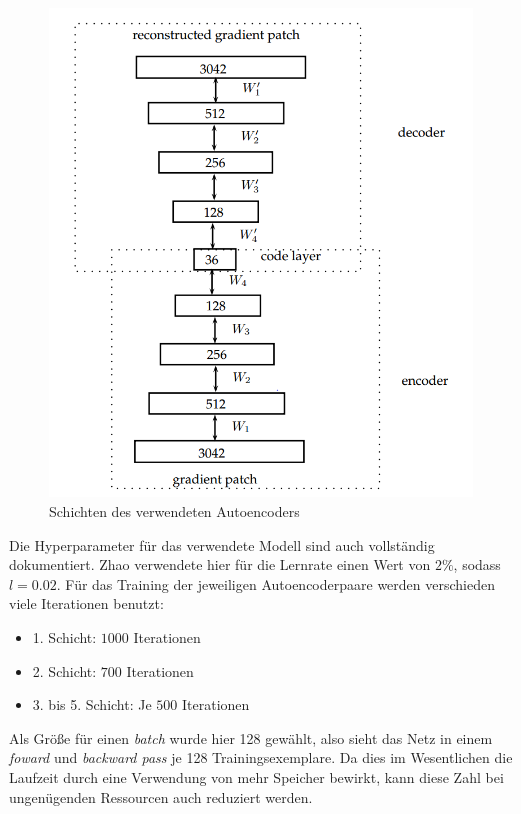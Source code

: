 \begin{figure}
	\centering
	\includegraphics[scale=0.6]{images/ae_model.png}
	\caption{Schichten des verwendeten Autoencoders \cite{aed2016}}
	\label{img:ae_model}
\end{figure}

Die Hyperparameter für das verwendete Modell sind auch vollständig dokumentiert. Zhao verwendete hier für die Lernrate einen Wert von $2\%$, sodass $l = 0.02$. Für das Training der jeweiligen Autoencoderpaare werden verschieden viele Iterationen benutzt:
\begin{itemize}
	\item 1. Schicht: $1000$ Iterationen
	\item 2. Schicht: $700$ Iterationen
	\item 3. bis 5. Schicht: Je $500$ Iterationen
\end{itemize}
Als Größe für einen \textit{batch} wurde hier 128 gewählt, also sieht das Netz in einem \textit{foward} und \textit{backward pass} je 128 Trainingsexemplare. Da dies im Wesentlichen die Laufzeit durch eine Verwendung von mehr Speicher bewirkt, kann diese Zahl bei ungenügenden Ressourcen auch reduziert werden.


